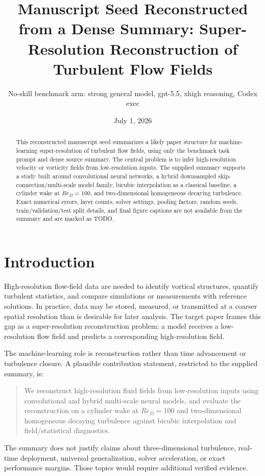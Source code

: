 \documentclass[11pt]{article}
\title{Manuscript Seed Reconstructed from a Dense Summary: Super-Resolution Reconstruction of Turbulent Flow Fields}
\author{No-skill benchmark arm: strong general model, gpt-5.5, xhigh reasoning, Codex exec}
\date{July 1, 2026}
\begin{document}
\maketitle

\begin{abstract}
This reconstructed manuscript seed summarizes a likely paper structure for machine-learning super-resolution of turbulent flow fields, using only the benchmark task prompt and dense source summary. The central problem is to infer high-resolution velocity or vorticity fields from low-resolution inputs. The supplied summary supports a study built around convolutional neural networks, a hybrid downsampled skip-connection/multi-scale model family, bicubic interpolation as a classical baseline, a cylinder wake at $Re_D=100$, and two-dimensional homogeneous decaying turbulence. Exact numerical errors, layer counts, solver settings, pooling factors, random seeds, train/validation/test split details, and final figure captions are not available from the summary and are marked as TODO.
\end{abstract}

\section{Introduction}
High-resolution flow-field data are needed to identify vortical structures, quantify turbulent statistics, and compare simulations or measurements with reference solutions. In practice, data may be stored, measured, or transmitted at a coarser spatial resolution than is desirable for later analysis. The target paper frames this gap as a super-resolution reconstruction problem: a model receives a low-resolution flow field and predicts a corresponding high-resolution field.

The machine-learning role is reconstruction rather than time advancement or turbulence closure. A plausible contribution statement, restricted to the supplied summary, is:

\begin{quote}
We reconstruct high-resolution fluid fields from low-resolution inputs using convolutional and hybrid multi-scale neural models, and evaluate the reconstruction on a cylinder wake at $Re_D=100$ and two-dimensional homogeneous decaying turbulence against bicubic interpolation and field/statistical diagnostics.
\end{quote}

The summary does not justify claims about three-dimensional turbulence, real-time deployment, universal generalization, solver acceleration, or exact performance margins. Those topics would require additional verified evidence.
\end{document}
